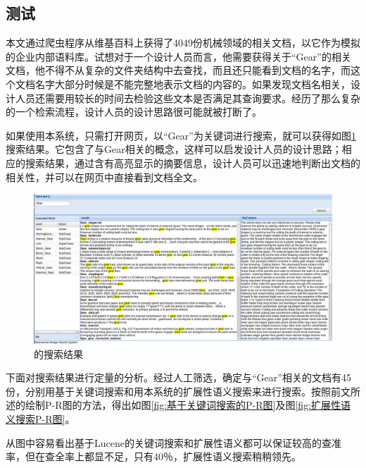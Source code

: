 \documentclass[12pt,a4paper]{article}
\newcommand{\wuhao}{\fontsize{10.5pt}{\baselineskip}\selectfont}
\begin{document}
	\subsection{测试}
	本文通过爬虫程序从维基百科上获得了4049份机械领域的相关文档，以它作为模拟的企业内部语料库。试想对于一个设计人员而言，他需要获得关于“{\Times Gear}”的相关文档，他不得不从复杂的文件夹结构中去查找，而且还只能看到文档的名字，而这个文档名字大部分时候是不能完整地表示文档的内容的。如果发现文档名相关，设计人员还需要用较长的时间去检验这些文本是否满足其查询要求。经历了那么复杂的一个检索流程，设计人员的设计思路很可能就被打断了。

	如果使用本系统，只需打开网页，以“{\Times Gear}”为关键词进行搜索，就可以获得如图\ref{fig:Gear的搜索结果}搜索结果。它包含了与{\Times Gear}相关的概念，这样可以启发设计人员的设计思路；相应的搜索结果，通过含有高亮显示的摘要信息，设计人员可以迅速地判断出文档的相关性，并可以在网页中直接看到文档全文。

	
	\begin{figure}[htbp]
	\centering
	\includegraphics[width=6in]{fig/SearchResult.png}
	\caption{\wuhao {\Times Gear}的搜索结果}
	\label{fig:Gear的搜索结果}
	\end{figure}
	
	下面对搜索结果进行定量的分析。经过人工筛选，确定与“{\Times Gear}”相关的文档有45份，分别用基于关键词搜索和用本系统的扩展性语义搜索来进行搜索。按照前文所述的绘制{\Times P-R}图的方法，得出如图\ref{fig:基于关键词搜索的P-R图}及图\ref{fig:扩展性语义搜索P-R图}。

	从图中容易看出基于{\Times Lucene}的关键词搜索和扩展性语义都可以保证较高的查准率，但在查全率上都显不足，只有40％，扩展性语义搜索稍稍领先。
\end{document}
